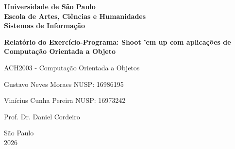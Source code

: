 \begin{titlepage}
    \begin{center}

        \textbf{\Large
        Universidade de São Paulo\\
        Escola de Artes, Ciências e Humanidades\\
        Sistemas de Informação
        }

        \vspace{3cm}

        {\LARGE
        \textbf{Relatório do Exercício-Programa: Shoot 'em up com aplicações de Computação Orientada a Objeto}
        }

        \vspace{0.5cm}

        {\Large
        ACH2003 - Computação Orientada a Objetos
        }

        \vfill

        \begin{flushleft}
            Gustavo Neves Moraes \hfill NUSP: 16986195

            Vinícius Cunha Pereira \hfill NUSP: 16973242
        \end{flushleft}

        \vspace{2cm}

        Prof. Dr. Daniel Cordeiro

        \vfill

        São Paulo\\
        2026

    \end{center}
\end{titlepage}
